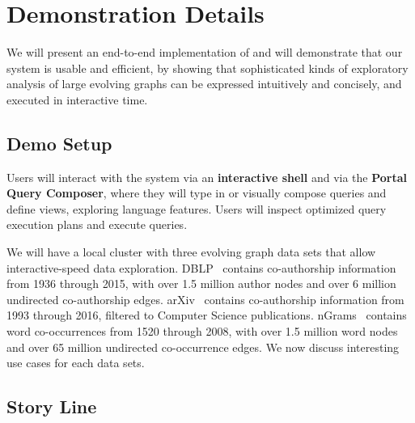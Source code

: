 \section{Demonstration Details}
\label{sec:demo}

We will present an end-to-end implementation of \ql and will
demonstrate that our system is usable and efficient, by showing that
sophisticated kinds of exploratory analysis of large evolving graphs
can be expressed intuitively and concisely, and executed in
interactive time.

\subsection{Demo Setup}
\label{sec:setup}

Users will interact with the \ql system via an {\bf interactive shell}
and via the {\bf Portal Query Composer}, where they will type in or
visually compose queries and define \tg views, exploring language
features.  Users will inspect optimized
query execution plans and execute queries.

We will have a local cluster with three evolving graph data sets that
allow interactive-speed data exploration.  DBLP~\cite{dblp} contains
co-authorship information from 1936 through 2015, with over 1.5
million author nodes and over 6 million undirected co-authorship
edges.  arXiv~\cite{arxiv} contains co-authorship information from
1993 through 2016, filtered to Computer Science publications.
nGrams~\cite{nGrams} contains word co-occurrences from 1520 through
2008, with over 1.5 million word nodes and over 65 million undirected
co-occurrence edges.  We now discuss interesting use cases for each
data sets.

\subsection{Story Line}
\label{sec:story}


